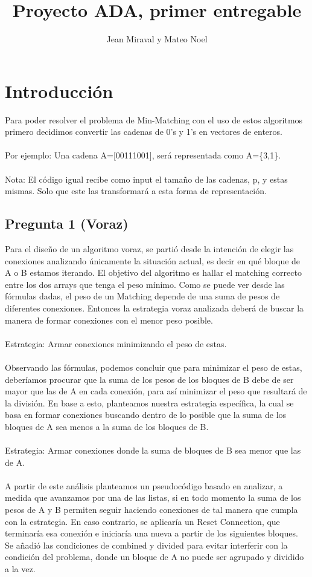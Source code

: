 \documentclass{article}
\title{Proyecto ADA, primer entregable}
\author{Jean Miraval y  Mateo Noel}
\begin{document}
	\maketitle
	\section{Introducción}
	Para poder resolver el problema de Min-Matching con el uso de estos algoritmos primero decidimos convertir las cadenas de 0's y 1's en vectores de enteros.\\\\
	Por ejemplo: Una cadena A=[00111001], será representada como A=\{3,1\}. \\\\
	Nota: El código igual recibe como input el tamaño de las cadenas, p, y estas mismas. Solo que este las transformará a esta forma de representación.
	
	
	\subsection*{Pregunta 1 (Voraz)} 
	Para el diseño de un algoritmo voraz, se partió desde la intención de elegir las conexiones analizando únicamente la situación actual, es decir en qué bloque de A o B estamos iterando. El objetivo del algoritmo es hallar el matching correcto entre los dos arrays que tenga el peso mínimo. Como se puede ver desde las fórmulas dadas, el peso de un Matching depende de una suma de pesos de diferentes conexiones. Entonces la estrategia voraz analizada deberá de buscar la manera de formar conexiones con el menor peso posible.
	\\\\Estrategia: Armar conexiones minimizando el peso de estas.
	\\\\Observando las fórmulas, podemos concluir que para minimizar el peso de estas, deberíamos procurar que la suma de los pesos de los bloques de B debe de ser mayor que las de A en cada conexión, para así minimizar el peso que resultará de la división. En base a esto, planteamos nuestra estrategia específica, la cual se basa en formar conexiones buscando dentro de lo posible que la suma de los bloques de A sea menos a la suma de los bloques de B.\\\\ Estrategia: Armar conexiones donde la suma de bloques de B sea menor que las de A.\\\\
	A partir de este análisis planteamos un pseudocódigo basado en analizar, a medida que avanzamos por una de las listas, si en todo momento la suma de los pesos de A y B permiten seguir haciendo conexiones de tal manera que cumpla con la estrategia. En caso contrario, se aplicaría un Reset Connection, que terminaría esa conexión e iniciaría una nueva a partir de los siguientes bloques. Se añadió las condiciones de combined y divided para evitar interferir con la condición del problema, donde un bloque de A no puede ser agrupado y dividido a la vez.
	
\end{document}
